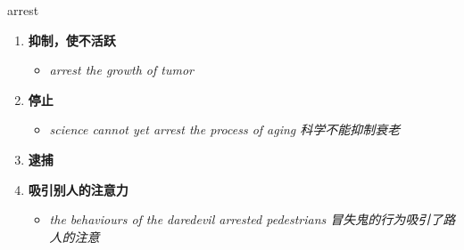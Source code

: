 
\begin{frame}
{\huge arrest}
\begin{center}
\begin{enumerate}\Large
  \item \textbf{抑制，使不活跃}
  \begin{itemize}
    \item \em{\Large{arrest the growth of tumor}}
  \end{itemize}
  \item \textbf{停止}
  \begin{itemize}
    \item \em{\Large{science cannot yet arrest the process of aging 科学不能抑制衰老}}
  \end{itemize}
  \item \textbf{逮捕}
  \item \textbf{吸引别人的注意力}
  \begin{itemize}
    \item \em{\Large{the behaviours of the daredevil arrested pedestrians 冒失鬼的行为吸引了路人的注意}}
  \end{itemize}
\end{enumerate}
\end{center}
\end{frame}
